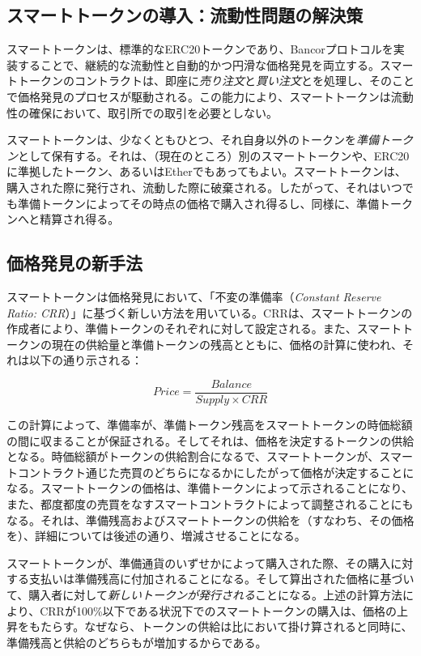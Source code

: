 \documentclass{jsarticle}
\begin{document}
  \subsection{スマートトークンの導入：流動性問題の解決策}

  スマートトークンは、標準的なERC20トークンであり、Bancorプロトコルを実装することで、継続的な流動性と自動的かつ円滑な価格発見を両立する。スマートトークンのコントラクトは、即座に\emph{売り注文}と\emph{買い注文}とを処理し、そのことで価格発見のプロセスが駆動される。この能力により、スマートトークンは流動性の確保において、取引所での取引を必要としない。

  スマートトークンは、少なくともひとつ、それ自身以外のトークンを\emph{準備トークン}として保有する。それは、（現在のところ）別のスマートトークンや、ERC20に準拠したトークン、あるいはEtherでもあってもよい。スマートトークンは、購入された際に発行され、流動した際に破棄される。したがって、それはいつでも準備トークンによってその時点の価格で購入され得るし、同様に、準備トークンへと精算され得る。

  \subsection{価格発見の新手法}

  スマートトークンは価格発見において、「不変の準備率（\textit{Constant Reserve Ratio: CRR}）」に基づく新しい方法を用いている。CRRは、スマートトークンの作成者により、準備トークンのそれぞれに対して設定される。また、スマートトークンの現在の供給量と準備トークンの残高とともに、価格の計算に使われ、それは以下の通り示される：

  \begin{equation*} \label{eq:price-discovery-formula}
    Price = \frac{Balance}{Supply \times CRR}
  \end{equation*}

  この計算によって、準備率が、準備トークン残高をスマートトークンの時価総額の間に収まることが保証される。そしてそれは、価格を決定するトークンの供給となる。時価総額がトークンの供給割合になるで、スマートトークンが、スマートコントラクト通じた売買のどちらになるかにしたがって価格が決定することになる。スマートトークンの価格は、準備トークンによって示されることになり、また、都度都度の売買をなすスマートコントラクトによって調整されることにもなる。それは、準備残高およびスマートトークンの供給を（すなわち、その価格を）、詳細については後述の通り、増減させることになる。

  スマートトークンが、準備通貨のいずせかによって購入された際、その購入に対する支払いは準備残高に付加されることになる。そして算出された価格に基づいて、購入者に対して\emph{新しいトークンが発行される}ことになる。上述の計算方法により、CRRが100\%以下である状況下でのスマートトークンの購入は、価格の上昇をもたらす。なぜなら、トークンの供給は比において掛け算されると同時に、準備残高と供給のどちらもが増加するからである。
\end{document}
